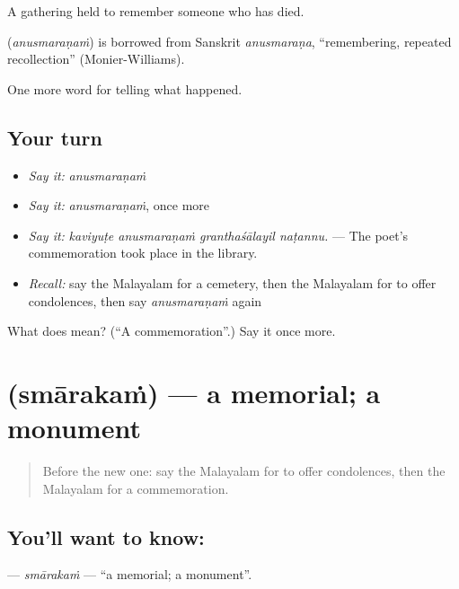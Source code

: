 A gathering held to remember someone who has died.

\begin{cousinweb}
\textbf{} (\emph{anusmaraṇaṁ}) is borrowed from Sanskrit \emph{anusmaraṇa}, \textquotedblleft{}remembering, repeated recollection\textquotedblright{} (Monier-Williams).
\end{cousinweb}

\begin{grammarlens}[title={What you've built}]
One more word for telling what happened.
\end{grammarlens}

\subsection*{Your turn}
\begin{itemize}
\raggedright
  \item \emph{Say it:} \emph{anusmaraṇaṁ}
  \item \emph{Say it:} \emph{anusmaraṇaṁ}, once more
  \item \emph{Say it:} \emph{kaviyuṭe anusmaraṇaṁ granthaśālayil naṭannu.} — The poet's commemoration took place in the library.
  \item \emph{Recall:} say the Malayalam for a cemetery, then the Malayalam for to offer condolences, then say \emph{anusmaraṇaṁ} again
\end{itemize}

\begin{tcolorbox}[breakable,colback=teal!4,colframe=teal!35!black,title={Before you move on}]
What does  mean? (\textquotedblleft{}A commemoration\textquotedblright{}.) Say it once more.
\end{tcolorbox}
\section[\texorpdfstring{\ml{സ്മാരകം} (smārakaṁ)}{സ്മാരകം (smārakaṁ)}]{ (smārakaṁ) — a memorial; a monument}

\label{lesson:ML-C393-smarakam}



\begin{quote}
Before the new one: say the Malayalam for to offer condolences, then the Malayalam for a commemoration.
\end{quote}

\subsection*{You'll want to know: }
\textbf{} — \emph{smārakaṁ} — \textquotedblleft{}a memorial; a monument\textquotedblright{}.


